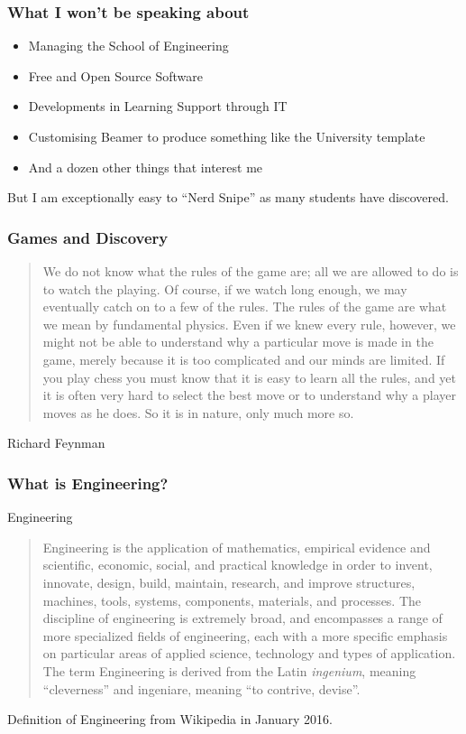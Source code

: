 \documentclass{beamer}
\begin{document}
{
\begin{frame}
  \frametitle{What I won't be speaking about}
  
  \begin{itemize}
    \item Managing the School of Engineering
    \item Free and Open Source Software
    \item Developments in Learning Support through IT
    \item Customising Beamer to produce something like the University template
    \item And a dozen other things that interest me
  \end{itemize}
  \vskip1cm
  \pause
  But I am exceptionally easy to ``Nerd Snipe'' as many students have discovered.
\end{frame}


\begin{frame}
  \frametitle{Games and Discovery}

\begin{block}{}
\begin{quote}
We do not know what the rules of the game are; all we are allowed to do is to watch the playing. Of course, if we watch long enough, we may eventually catch on to a few of the rules. The rules of the game are what we mean by fundamental physics. Even if we knew every rule, however, we might not be able to understand why a particular move is made in the game, merely because it is too complicated and our minds are limited. If you play chess you must know that it is easy to learn all the rules, and yet it is often very hard to select the best move or to understand why a player moves as he does. So it is in nature, only much more so.
\end{quote}
\end{block}  
\hfill Richard Feynman 
\end{frame}
} %


\begin{frame}
  \frametitle{What is Engineering?}
	\begin{block}{Engineering}
	\begin{quote}Engineering is the application of mathematics, empirical evidence and scientific, economic, social, and practical knowledge in order to invent, innovate, design, build, maintain, research, and improve structures, machines, tools, systems, components, materials, and processes.
The discipline of engineering is extremely broad, and encompasses a range of more specialized fields of engineering, each with a more specific emphasis on particular areas of applied science, technology and types of application.
The term Engineering is derived from the Latin \emph{ingenium}, meaning ``cleverness'' and ingeniare, meaning ``to contrive, devise''.
   \end{quote}
	\end{block}
	\hfill Definition of Engineering from Wikipedia in January 2016.
\end{frame}
\end{document}
